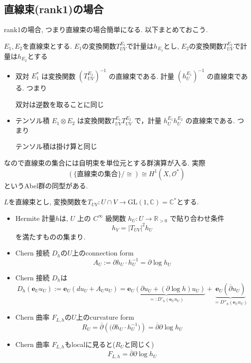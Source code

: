 \documentclass[dvipdfmx,a4paper,11pt]{article} %
\theoremstyle{definition}
\theoremstyle{remark}
\numberwithin{equation}{section}
\newcommand{\R}{\mathbb{R}}
\newcommand{\C}{\mathbb{C}}
\begin{document}
\subsection{直線束(rank1)の場合}
rank1の場合, つまり直線束の場合簡単になる. 以下まとめておこう. 

\begin{tcolorbox}[mybox]
$E_1,E_2$を直線束とする. 
$E_1$の変換関数$T^{E_1}_{UV}$で計量は$h_{E_1}$とし, 
$E_2$の変換関数$T^{E_2}_{UV}$で計量は$h_{E_2}$とする
 
\begin{itemize}
\item  双対 \(E_1^*\) は変換関数 \((T^{E_1}_{UV})^{-1}\) の直線束である. 
計量 \((h^{E_1}_U)^{-1}\) の直線束である. 
つまり
\begin{center}
双対は逆数を取ることに同じ
\end{center}

\item テンソル積 \(E_1 \otimes E_2\) は変換関数\(T^{E_1}_{UV}T^{E_2}_{UV}\) で，計量 \(h^{E_1}_Uh^{E_2}_U\) の直線束である. 
つまり
\begin{center}
テンソル積は掛け算と同じ
\end{center}
\end{itemize}
\end{tcolorbox}
なので直線束の集合には自明束を単位元とする群演算が入る. 
実際
$$
\left(\{\text{直線束の集合}\}/\cong\right) \cong H^1(X, \mathcal{O}^{*})
$$ 
というAbel群の同型がある. 


\begin{tcolorbox}[mybox]
$L$を直線束とし, 変換関数を\({T_{UV}} : U \cap V \to \mathrm{GL}(1,\C)=\C^{*}\)とする. 
\begin{itemize}
\item Hermite 計量$h$は, \(U\) 上の \(C^{\infty}\) 級関数 \(h_U : U \to \R_{>0}\) で貼り合わせ条件
\[
h_V 
 =|T_{UV}|^2 h_U
\]
を満たすものの集まり.
\item Chern 接続 $D_h$の$U$上のconnection form 
$$
A_U:=\partial h_U\cdot h_U^{-1}
=\partial \log h_U
$$
\item Chern 接続 $D_h$は
$$
D_{h}(\mathbf{e}_U u_U)
:=\mathbf{e}_U (du_U + A_Uu_U)
=
\underbrace{\mathbf{e}_U (\partial u_U + (\partial \log h)u_U)}_
{=:D'_{h}(\mathbf{e}_U u_U)}
+
\underbrace{\mathbf{e}_U (\overline{\partial} u_U )}_{=D''_{h}(\mathbf{e}_U u_U)}
$$
\item Chern 曲率 $F_{L,h}$の$U$上のcurvature form 
$$
{R_U}=\overline{\partial}\left( \bigl(\partial h_U\cdot h_U^{-1}\bigr) \right)
=\overline{\partial}\partial \log h_U
$$
\item Chern 曲率 $F_{L,h}$もlocalに見ると($R_U$と同じく)
$$
F_{L,h}=\overline{\partial}\partial \log h_U
$$
\end{itemize}
 \end{tcolorbox}
\end{document}
